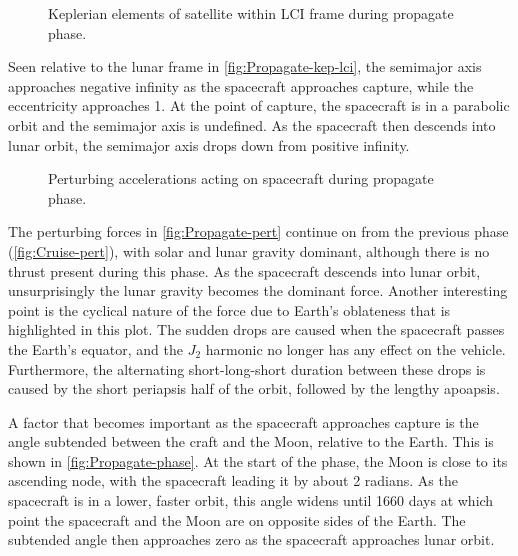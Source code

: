 \begin{figure}
\centering
\def\svgwidth{\figurewidth}

\caption{Keplerian elements of satellite within LCI frame during propagate phase.} \label{fig:Propagate-kep-lci}
\end{figure}

Seen relative to the lunar frame in \autoref{fig:Propagate-kep-lci}, the semimajor axis approaches negative infinity as the spacecraft approaches capture, while the eccentricity approaches 1. At the point of capture, the spacecraft is in a parabolic orbit and the semimajor axis is undefined. As the spacecraft then descends into lunar orbit, the semimajor axis drops down from positive infinity.

\begin{figure}
\centering
\def\svgwidth{\figurewidth}

\caption{Perturbing accelerations acting on spacecraft during propagate phase.} \label{fig:Propagate-pert}
\end{figure}

The perturbing forces in \autoref{fig:Propagate-pert} continue on from the previous phase (\autoref{fig:Cruise-pert}), with solar and lunar gravity dominant, although there is no thrust present during this phase. As the spacecraft descends into lunar orbit, unsurprisingly the lunar gravity becomes the dominant force. Another interesting point is the cyclical nature of the force due to Earth's oblateness that is highlighted in this plot. The sudden drops are caused when the spacecraft passes the Earth's equator, and the $J_2$ harmonic no longer has any effect on the vehicle. Furthermore, the alternating short-long-short duration between these drops is caused by the short periapsis half of the orbit, followed by the lengthy apoapsis.

%

A factor that becomes important as the spacecraft approaches capture is the angle subtended between the craft and the Moon, relative to the Earth. This is shown in \autoref{fig:Propagate-phase}. At the start of the phase, the Moon is close to its ascending node, with the spacecraft leading it by about 2 radians. As the spacecraft is in a lower, faster orbit, this angle widens until 1660 days at which point the spacecraft and the Moon are on opposite sides of the Earth. The subtended angle then approaches zero as the spacecraft approaches lunar orbit.

